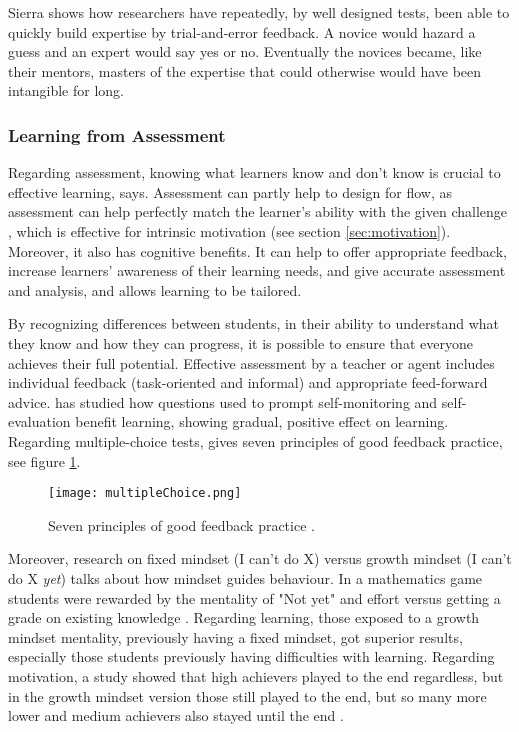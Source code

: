   Sierra shows how researchers have repeatedly, by well designed tests, been able to quickly build expertise by trial-and-error feedback. A novice would hazard a guess and an expert would say yes or no. Eventually the novices became, like their mentors, masters of the expertise that could otherwise would have been intangible for long.

  \subsubsection{Learning from Assessment}\label{learning-assessment}

  Regarding assessment, knowing what learners know and don't know is crucial to effective learning, \cite{luckin} says. Assessment can partly help to design for flow, as assessment can help perfectly match the learner's ability with the given challenge \citep{bruhlmann}, which is effective for intrinsic motivation (see section \ref{sec:motivation}). Moreover, it also has cognitive benefits. It can help to offer appropriate feedback, increase learners' awareness of their learning needs, and give accurate assessment and analysis, and allows learning to be tailored.

  By recognizing differences between students, in their ability to understand what they know and how they can progress, it is possible to ensure that everyone achieves their full potential. Effective assessment by a teacher or agent includes individual feedback (task-oriented and informal) and appropriate feed-forward advice. \cite{sitzmann} has studied how questions used to prompt self-monitoring and self-evaluation benefit learning, showing gradual, positive  effect on learning. Regarding multiple-choice tests, \cite{nicol} gives seven principles of good feedback practice, see figure \ref{fig:multiple-choice}.

  \begin{figure}[h]
    \centering
    \texttt{[image: multipleChoice.png]}
    \caption{Seven principles of good feedback practice \cite{nicol}.}
    \label{fig:multiple-choice}
\end{figure}

  Moreover, research on fixed mindset (I can't do X) versus growth mindset (I can't do X \textit{yet}) talks about how mindset guides behaviour. In a mathematics game students were rewarded by the mentality of "Not yet" and effort versus getting a grade on existing knowledge \citep{dweck}. Regarding learning, those exposed to a growth mindset mentality, previously having a fixed mindset, got superior results, especially those students previously having difficulties with learning. Regarding motivation, a study showed that high achievers played to the end regardless, but in the growth mindset version those still played to the end, but so many more lower and medium achievers also stayed until the end \citep{dweck}.

